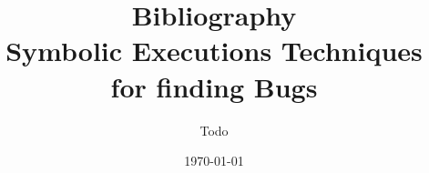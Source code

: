 \documentclass[11pt]{article}
\begin{document}
\title{Bibliography\\Symbolic Executions Techniques for finding Bugs}
\author{Todo}
\date{\today}
\maketitle

\nocite{*}


{}

\end{document}
